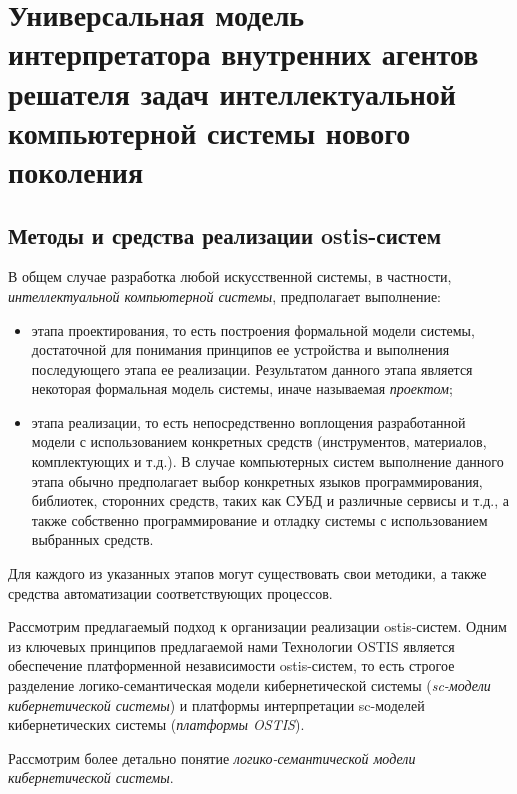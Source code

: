 \chapter{Универсальная модель интерпретатора внутренних агентов решателя задач интеллектуальной компьютерной системы нового поколения}
\label{chapter_interpreter}


\section{Методы и средства реализации ostis-систем}

В общем случае разработка любой искусственной системы, в частности, \textit{интеллектуальной компьютерной системы}, предполагает выполнение:
\begin{itemize}
\item этапа проектирования, то есть построения формальной модели системы, достаточной для понимания принципов ее устройства и выполнения последующего этапа ее реализации. Результатом данного этапа является некоторая формальная модель системы, иначе называемая \textit{проектом};
\item этапа реализации, то есть непосредственно воплощения разработанной модели с использованием конкретных средств (инструментов, материалов, комплектующих и т.д.). В случае компьютерных систем выполнение данного этапа обычно предполагает выбор конкретных языков программирования, библиотек, сторонних средств, таких как СУБД и различные сервисы и т.д., а также собственно программирование и отладку системы с использованием выбранных средств.
\end{itemize}

Для каждого из указанных этапов могут существовать свои методики, а также средства автоматизации соответствующих процессов.

Рассмотрим предлагаемый подход к организации реализации ostis-систем. Одним из ключевых принципов предлагаемой нами Технологии OSTIS является обеспечение платформенной независимости ostis-систем, то есть строгое разделение логико-семантическая модели кибернетической системы (\textit{sc-модели кибернетической системы}) и платформы интерпретации sc-моделей кибернетических системы (\textit{платформы OSTIS}). 


Рассмотрим более детально понятие \textit{логико-семантической модели кибернетической системы}.

